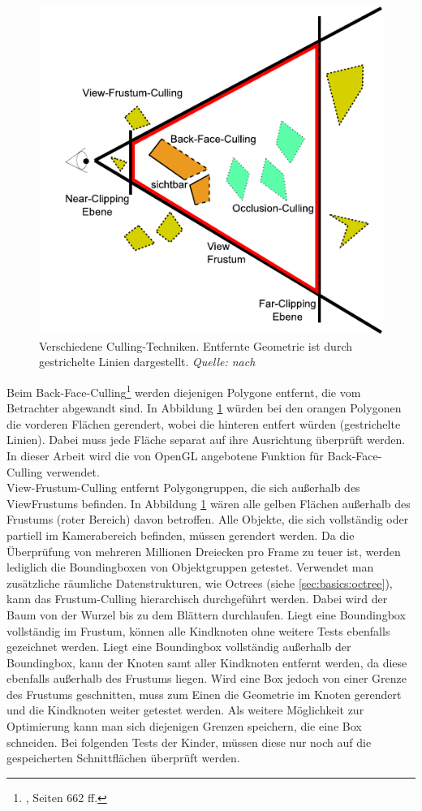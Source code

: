 \begin{figure}
  \centering
  \includegraphics[scale=0.8]{images/culling.pdf}
  \caption{Verschiedene Culling-Techniken. Entfernte Geometrie ist durch gestrichelte Linien dargestellt. \textit{Quelle: nach \cite{culling}} }
  \label{fig:basics:culling}
\end{figure}
Beim Back-Face-Culling\footnote{\cite{RTR3}, Seiten 662 ff.} werden diejenigen Polygone entfernt, die vom Betrachter abgewandt sind. In Abbildung \ref{fig:basics:culling} würden bei den orangen Polygonen die vorderen Flächen gerendert, wobei die hinteren entfert würden (gestrichelte Linien). Dabei muss jede Fläche separat auf ihre Ausrichtung überprüft werden. In dieser Arbeit wird die von OpenGL angebotene Funktion für Back-Face-Culling verwendet.\\
View-Frustum-Culling entfernt Polygongruppen, die sich außerhalb des ViewFrustums befinden. In Abbildung \ref{fig:basics:culling} wären alle gelben Flächen außerhalb des Frustums (roter Bereich) davon betroffen. Alle Objekte, die sich vollständig oder partiell im Kamerabereich befinden, müssen gerendert werden. Da die Überprüfung von mehreren Millionen Dreiecken pro Frame zu teuer ist, werden lediglich die Boundingboxen von Objektgruppen getestet. Verwendet man zusätzliche räumliche Datenstrukturen, wie Octrees (siehe \ref{sec:basics:octree}), kann das Frustum-Culling hierarchisch durchgeführt werden. Dabei wird der Baum von der Wurzel bis zu dem Blättern durchlaufen. Liegt eine Boundingbox vollständig im Frustum, können alle Kindknoten ohne weitere Tests ebenfalls gezeichnet werden. Liegt eine Boundingbox vollständig außerhalb der Boundingbox, kann der Knoten samt aller Kindknoten entfernt werden, da diese ebenfalls außerhalb des Frustums liegen. Wird eine Box jedoch von einer Grenze des Frustums geschnitten, muss zum Einen die Geometrie im Knoten gerendert und die Kindknoten weiter getestet werden. Als weitere Möglichkeit zur Optimierung kann man sich diejenigen Grenzen speichern, die eine Box schneiden. Bei folgenden Tests der Kinder, müssen diese nur noch auf die gespeicherten Schnittflächen überprüft werden.\\
